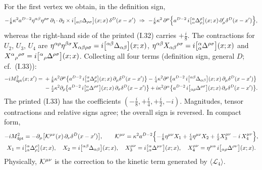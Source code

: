 \documentclass[aps,prd,onecolumn,10pt,nofootinbib,floatfix]{revtex4-2}
\newcommand{\eqI}[1]{(I.#1)}
\begin{document}
For the first vertex we obtain, in the definition sign,
\begin{equation}\label{eq:s3:I32}
-\tfrac i8\kappa^2a^{D-2}\eta^{\alpha\beta}\eta^{\rho\sigma}\,\partial_1\!\cdot\partial_2
\times i\bigl[{}_{\alpha\beta}\Delta_{\rho\sigma}\bigr](x;x)\,\delta^D(x-x')
\ \Rightarrow\ -\tfrac i8\kappa^2\,\partial^\mu\Bigl\{a^{D-2}\,
i\bigl[{}^\alpha_\alpha\Delta^\rho_\rho\bigr](x;x)\,\partial'_\mu\delta^D(x-x')\Bigr\},
\end{equation}
whereas the right-hand side of the printed \eqI{32} carries $+\frac i8$. The contractions for
$U_2$, $U_3$, $U_4$ are $\eta^{\alpha\rho}\eta^{\beta\sigma}X_{\alpha\beta\rho\sigma}
=i\bigl[{}^{\alpha\beta}\Delta_{\alpha\beta}\bigr](x;x)$,
$\eta^{\alpha\beta}X_{\alpha\beta}{}^{\rho\sigma}=i\bigl[{}^\alpha_\alpha\Delta^{\rho\sigma}\bigr](x;x)$
and $X^\alpha{}_\rho{}^{\rho\sigma}=i\bigl[{}^\alpha{}_\rho\Delta^{\rho\sigma}\bigr](x;x)$. Collecting
all four terms (definition sign, general $D$; cf.\ \eqI{33}):
\begin{equation}\label{eq:s3:I33}
\begin{aligned}
-iM^2_{\rm 4pt}(x;x')={}&+\tfrac i8\kappa^2\partial^\mu\bigl\{a^{D-2}\,i\bigl[{}^\alpha_\alpha\Delta^\rho_\rho\bigr](x;x)\,
\partial_\mu\delta^D(x-x')\bigr\}
-\tfrac i4\kappa^2\partial^\mu\bigl\{a^{D-2}\,i\bigl[{}^{\alpha\beta}\Delta_{\alpha\beta}\bigr](x;x)\,
\partial_\mu\delta^D(x-x')\bigr\}\\
&-\tfrac i2\kappa^2\partial_\rho\bigl\{a^{D-2}\,i\bigl[{}^\alpha_\alpha\Delta^{\rho\sigma}\bigr](x;x)\,
\partial_\sigma\delta^D(x-x')\bigr\}
+i\kappa^2\partial^\alpha\bigl\{a^{D-2}\,i\bigl[{}_{\alpha\rho}\Delta^{\rho\sigma}\bigr](x;x)\,
\partial_\sigma\delta^D(x-x')\bigr\}.
\end{aligned}
\end{equation}
The printed \eqI{33} has the coefficients $(-\frac i8,+\frac i4,+\frac i2,-i)$. Magnitudes,
tensor contractions and relative signs agree; the overall sign is reversed. In compact form,
\begin{equation}\label{eq:s3:Kcal}
\begin{gathered}
-iM^2_{\rm 4pt}=-\partial_\mu\bigl[\mathcal K^{\mu\nu}(x)\,\partial_\nu\delta^D(x-x')\bigr],\qquad
\mathcal K^{\mu\nu}=\kappa^2a^{D-2}\Bigl\{-\tfrac i8\eta^{\mu\nu}X_1+\tfrac i4\eta^{\mu\nu}X_2
+\tfrac i2X_3^{\mu\nu}-i\,X_4^{\mu\nu}\Bigr\},\\
X_1=i\bigl[{}^\alpha_\alpha\Delta^\rho_\rho\bigr](x;x),\quad
X_2=i\bigl[{}^{\alpha\beta}\Delta_{\alpha\beta}\bigr](x;x),\quad
X_3^{\mu\nu}=i\bigl[{}^\alpha_\alpha\Delta^{\mu\nu}\bigr](x;x),\quad
X_4^{\mu\nu}=\eta^{\mu\alpha}\,i\bigl[{}_{\alpha\rho}\Delta^{\rho\nu}\bigr](x;x) .
\end{gathered}
\end{equation}
Physically, $\mathcal K^{\mu\nu}$ is the correction to the kinetic term generated by
$\langle\mathcal L_4\rangle$.
\end{document}
